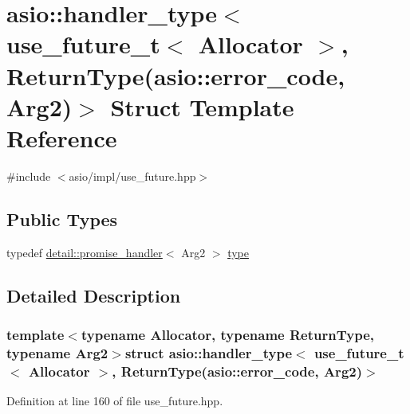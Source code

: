 \hypertarget{structasio_1_1handler__type_3_01use__future__t_3_01_allocator_01_4_00_01_01_01_01_01_01_01_01_01912bb47ba4497b53d32e350e5bfa0a51}{}\section{asio\+:\+:handler\+\_\+type$<$ use\+\_\+future\+\_\+t$<$ Allocator $>$, Return\+Type(asio\+:\+:error\+\_\+code, Arg2)$>$ Struct Template Reference}
\label{structasio_1_1handler__type_3_01use__future__t_3_01_allocator_01_4_00_01_01_01_01_01_01_01_01_01912bb47ba4497b53d32e350e5bfa0a51}


{\ttfamily \#include $<$asio/impl/use\+\_\+future.\+hpp$>$}

\subsection*{Public Types}
\begin{DoxyCompactItemize}
\item 
typedef \hyperlink{classasio_1_1detail_1_1promise__handler}{detail\+::promise\+\_\+handler}$<$ Arg2 $>$ \hyperlink{structasio_1_1handler__type_3_01use__future__t_3_01_allocator_01_4_00_01_01_01_01_01_01_01_01_01912bb47ba4497b53d32e350e5bfa0a51_a77bcd6ab17577d0adf5835708fb32989}{type}
\end{DoxyCompactItemize}


\subsection{Detailed Description}
\subsubsection*{template$<$typename Allocator, typename Return\+Type, typename Arg2$>$struct asio\+::handler\+\_\+type$<$ use\+\_\+future\+\_\+t$<$ Allocator $>$,           Return\+Type(asio\+::error\+\_\+code, Arg2)$>$}



Definition at line 160 of file use\+\_\+future.\+hpp.



